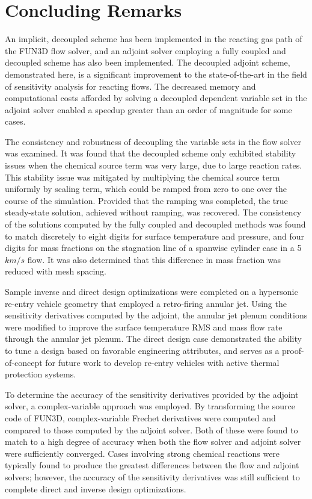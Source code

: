 \chapter{Concluding Remarks}
\label{chapter-ten}

An implicit, decoupled scheme has been implemented in the reacting gas path of
the FUN3D flow solver, and an adjoint solver employing a fully coupled and
decoupled scheme has also been implemented.  The decoupled adjoint scheme,
demonstrated here, is a significant improvement to the state-of-the-art in the
field of sensitivity analysis for reacting flows.  The decreased memory and
computational costs afforded by solving a decoupled dependent variable set in
the adjoint solver enabled a speedup greater than an order of magnitude for some
cases.  

The consistency and robustness of decoupling the variable sets in the flow
solver was examined.  It was found that the decoupled scheme only exhibited
stability issues when the chemical source term was very large, due to large
reaction rates.  This stability issue was mitigated by multiplying the chemical
source term uniformly by scaling term, which could be ramped from zero to one
over the course of the simulation.  Provided that the ramping was completed, the
true steady-state solution, achieved without ramping, was recovered.  The
consistency of the solutions computed by the fully coupled and decoupled methods
was found to match discretely to eight digits for surface temperature and
pressure, and four digits for mass fractions on the stagnation line of a
spanwise cylinder case in a 5 $km/s$ flow.  It was also determined that this
difference in mass fraction was reduced with mesh spacing.

Sample inverse and direct design optimizations were completed on a hypersonic
re-entry vehicle geometry that employed a retro-firing annular jet.  Using the
sensitivity derivatives computed by the adjoint, the annular jet plenum
conditions were modified to improve the surface temperature RMS and mass flow
rate through the annular jet plenum.  The direct design case demonstrated the
ability to tune a design based on favorable engineering attributes, and serves
as a proof-of-concept for future work to develop re-entry vehicles with active
thermal protection systems.

To determine the accuracy of the sensitivity derivatives provided by the adjoint
solver, a complex-variable approach was employed.  By transforming the source
code of FUN3D, complex-variable Frechet derivatives were computed and compared
to those computed by the adjoint solver.  Both of these were found to match to a
high degree of accuracy when both the flow solver and adjoint solver were
sufficiently converged.  Cases involving strong chemical reactions were
typically found to produce the greatest differences between the flow and adjoint
solvers; however, the accuracy of the sensitivity derivatives was still
sufficient to complete direct and inverse design optimizations.

